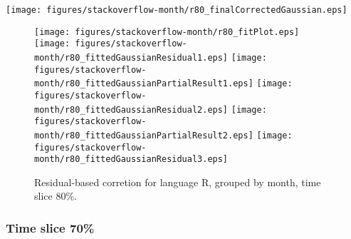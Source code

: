 \begin{center}
{\texttt{[image: figures/stackoverflow-month/r80\_finalCorrectedGaussian.eps]}}
\end{center}

\FloatBarrier

\begin{figure}[t]
\centering
{}
{\texttt{[image: figures/stackoverflow-month/r80\_fitPlot.eps]}}
{\texttt{[image: figures/stackoverflow-month/r80\_fittedGaussianResidual1.eps]}}
{\texttt{[image: figures/stackoverflow-month/r80\_fittedGaussianPartialResult1.eps]}}
{\texttt{[image: figures/stackoverflow-month/r80\_fittedGaussianResidual2.eps]}}
{\texttt{[image: figures/stackoverflow-month/r80\_fittedGaussianPartialResult2.eps]}}
{\texttt{[image: figures/stackoverflow-month/r80\_fittedGaussianResidual3.eps]}}
\caption{Residual-based corretion for language R, grouped by month, time slice 80\%.}
\end{figure}


\FloatBarrier


\subsubsection{Time slice 70\%}

